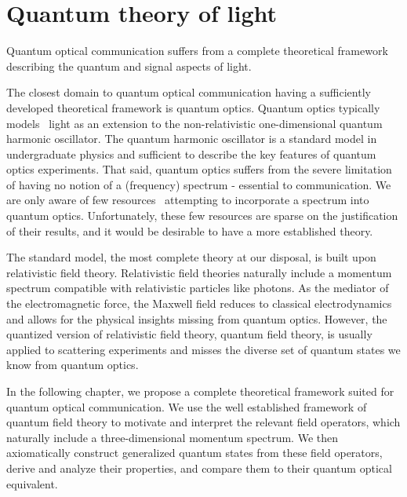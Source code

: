 \chapter{Quantum theory of light}\label{ch:light}

Quantum optical communication suffers from a complete theoretical framework describing the quantum and signal aspects of light.

The closest domain to quantum optical communication having a sufficiently developed theoretical framework is quantum optics.
Quantum optics typically models~\cite{Fox2006,Gerry2005,Haroche2006,Meystre2007} light as an extension to the non-relativistic one-dimensional quantum harmonic oscillator.
The quantum harmonic oscillator is a standard model in undergraduate physics and sufficient to describe the key features of quantum optics experiments.
That said, quantum optics suffers from the severe limitation of having no notion of a (frequency) spectrum - essential to communication.
We are only aware of few resources~\cite{Barnett2002,Shapiro2009,Loudon2000} attempting to incorporate a spectrum into quantum optics.
Unfortunately, these few resources are sparse on the justification of their results, and it would be desirable to have a more established theory.

The standard model, the most complete theory at our disposal, is built upon relativistic field theory.
Relativistic field theories naturally include a momentum spectrum compatible with relativistic particles like photons.
As the mediator of the electromagnetic force, the Maxwell field reduces to classical electrodynamics and allows for the physical insights missing from quantum optics.
However, the quantized version of relativistic field theory, quantum field theory, is usually applied to scattering experiments and misses the diverse set of quantum states we know from quantum optics.

In the following chapter, we propose a complete theoretical framework suited for quantum optical communication.
We use the well established framework of quantum field theory to motivate and interpret the relevant field operators, which naturally include a three-dimensional momentum spectrum.
We then axiomatically construct generalized quantum states from these field operators, derive and analyze their properties, and compare them to their quantum optical equivalent.
